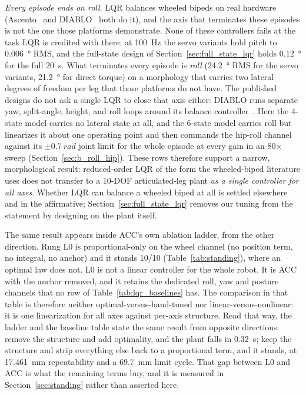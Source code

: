 \documentclass[a4paper,fleqn]{cas-dc}
\begin{document}
\emph{Every episode ends on roll.} LQR balances wheeled bipeds on real hardware (Ascento~\cite{klemm2019ascento} and DIABLO~\cite{diablo2024} both do it), and the axis that terminates these episodes is not the one those platforms
demonstrate. None of these controllers
fails at the task LQR is credited with there: at \SI{100}{Hz} the
servo variants hold pitch to \SI{0.006}{\degree} RMS, and the full-state design of
Section~\ref{sec:full_state_lqr} holds \SI{0.12}{\degree} for the full
\SI{20}{s}. What terminates every episode is \emph{roll} (\SI{24.2}{\degree} RMS
for the servo variants, \SI{21.2}{\degree} for direct torque) on a morphology
that carries two lateral degrees of freedom per leg that those platforms do not
have. The published designs do not ask a single LQR to close that axis either:
DIABLO runs separate yaw, split-angle, height, and roll loops around its balance
controller~\cite{diablo2024}. Here the 4-state model carries no lateral state at
all, and the 6-state model carries roll but linearizes it about one operating
point and then commands the hip-roll channel against its $\pm\SI{0.7}{rad}$ joint
limit for the whole episode at every gain in an \num{80}$\times$ sweep
(Section~\ref{sec:b_roll_hip}). These rows therefore support a narrow,
morphological result: reduced-order LQR of the form the wheeled-biped literature
uses does not transfer to a 10-DOF articulated-leg plant \emph{as a single
controller for all axes}. Whether LQR can balance a wheeled biped at all is
settled elsewhere and in the affirmative; Section~\ref{sec:full_state_lqr}
removes our tuning from the statement by designing on the plant itself.

The same result appears inside ACC's own ablation ladder, from the other
direction. Rung L0 is proportional-only on the wheel channel (no position term, no integral, no anchor) and it stands \num{10}/\num{10}
(Table~\ref{tab:standing}), where an optimal law does not. L0 is
not a linear controller for the whole robot. It is ACC with the anchor removed,
and it retains the dedicated roll, yaw and posture channels that no row of
Table~\ref{tab:lqr_baselines} has. The comparison in that table is therefore
neither optimal-versus-hand-tuned nor linear-versus-nonlinear: it is one
linearization for all axes against per-axis structure. Read that way, the ladder
and the baseline table state the same result from opposite directions: remove the structure and add optimality, and the plant falls in \SI{0.32}{s}; keep the
structure and strip everything else back to a proportional term, and it stands,
at \SI{17.461}{mm} repeatability and a \SI{69.7}{mm} limit cycle. That gap
between L0 and ACC is what the remaining terms buy, and it is measured in
Section~\ref{sec:standing} rather than asserted here.
\end{document}
